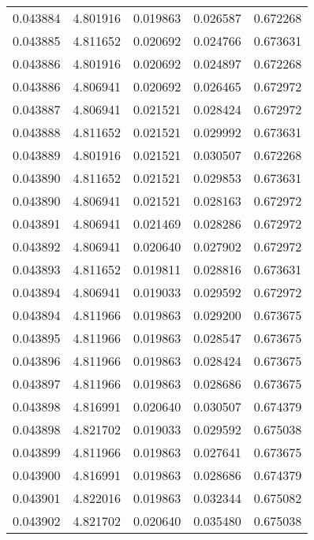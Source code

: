 \begin{tabular}{lrrrr}
0.043884    &  4.801916 &  0.019863 &  0.026587 &             0.672268 \\
0.043885    &  4.811652 &  0.020692 &  0.024766 &             0.673631 \\
0.043886    &  4.801916 &  0.020692 &  0.024897 &             0.672268 \\
0.043886    &  4.806941 &  0.020692 &  0.026465 &             0.672972 \\
0.043887    &  4.806941 &  0.021521 &  0.028424 &             0.672972 \\
0.043888    &  4.811652 &  0.021521 &  0.029992 &             0.673631 \\
0.043889    &  4.801916 &  0.021521 &  0.030507 &             0.672268 \\
0.043890    &  4.811652 &  0.021521 &  0.029853 &             0.673631 \\
0.043890    &  4.806941 &  0.021521 &  0.028163 &             0.672972 \\
0.043891    &  4.806941 &  0.021469 &  0.028286 &             0.672972 \\
0.043892    &  4.806941 &  0.020640 &  0.027902 &             0.672972 \\
0.043893    &  4.811652 &  0.019811 &  0.028816 &             0.673631 \\
0.043894    &  4.806941 &  0.019033 &  0.029592 &             0.672972 \\
0.043894    &  4.811966 &  0.019863 &  0.029200 &             0.673675 \\
0.043895    &  4.811966 &  0.019863 &  0.028547 &             0.673675 \\
0.043896    &  4.811966 &  0.019863 &  0.028424 &             0.673675 \\
0.043897    &  4.811966 &  0.019863 &  0.028686 &             0.673675 \\
0.043898    &  4.816991 &  0.020640 &  0.030507 &             0.674379 \\
0.043898    &  4.821702 &  0.019033 &  0.029592 &             0.675038 \\
0.043899    &  4.811966 &  0.019863 &  0.027641 &             0.673675 \\
0.043900    &  4.816991 &  0.019863 &  0.028686 &             0.674379 \\
0.043901    &  4.822016 &  0.019863 &  0.032344 &             0.675082 \\
0.043902    &  4.821702 &  0.020640 &  0.035480 &             0.675038 \\

\end{tabular}
